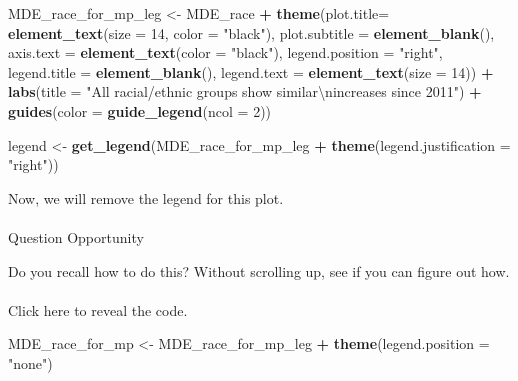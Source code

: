\documentclass[
]{article}
\newenvironment{Shaded}{\begin{snugshade}}{\end{snugshade}}
\newcommand{\CharTok}[1]{\textcolor[rgb]{0.31,0.60,0.02}{#1}}
\newcommand{\DataTypeTok}[1]{\textcolor[rgb]{0.13,0.29,0.53}{#1}}
\newcommand{\DecValTok}[1]{\textcolor[rgb]{0.00,0.00,0.81}{#1}}
\newcommand{\KeywordTok}[1]{\textcolor[rgb]{0.13,0.29,0.53}{\textbf{#1}}}
\newcommand{\NormalTok}[1]{#1}
\newcommand{\OperatorTok}[1]{\textcolor[rgb]{0.81,0.36,0.00}{\textbf{#1}}}
\newcommand{\StringTok}[1]{\textcolor[rgb]{0.31,0.60,0.02}{#1}}
\begin{document}
\begin{Shaded}
\begin{Highlighting}[]
\NormalTok{MDE_race_for_mp_leg <-}\StringTok{ }\NormalTok{MDE_race }\OperatorTok{+}
\StringTok{  }\KeywordTok{theme}\NormalTok{(}\DataTypeTok{plot.title=} \KeywordTok{element_text}\NormalTok{(}\DataTypeTok{size =} \DecValTok{14}\NormalTok{, }\DataTypeTok{color =} \StringTok{"black"}\NormalTok{),}
        \DataTypeTok{plot.subtitle =} \KeywordTok{element_blank}\NormalTok{(),}
        \DataTypeTok{axis.text =} \KeywordTok{element_text}\NormalTok{(}\DataTypeTok{color =} \StringTok{"black"}\NormalTok{),}
        \DataTypeTok{legend.position =} \StringTok{"right"}\NormalTok{, }
        \DataTypeTok{legend.title =} \KeywordTok{element_blank}\NormalTok{(),}
        \DataTypeTok{legend.text =} \KeywordTok{element_text}\NormalTok{(}\DataTypeTok{size =} \DecValTok{14}\NormalTok{)) }\OperatorTok{+}
\StringTok{  }\KeywordTok{labs}\NormalTok{(}\DataTypeTok{title =} \StringTok{"All racial/ethnic groups show similar}\CharTok{\textbackslash{}n}\StringTok{increases since 2011"}\NormalTok{) }\OperatorTok{+}
\StringTok{  }\KeywordTok{guides}\NormalTok{(}\DataTypeTok{color =} \KeywordTok{guide_legend}\NormalTok{(}\DataTypeTok{ncol =} \DecValTok{2}\NormalTok{))}

\NormalTok{legend <-}\StringTok{ }\KeywordTok{get_legend}\NormalTok{(MDE_race_for_mp_leg }\OperatorTok{+}
\StringTok{          }\KeywordTok{theme}\NormalTok{(}\DataTypeTok{legend.justification =} \StringTok{"right"}\NormalTok{))}
\end{Highlighting}
\end{Shaded}

Now, we will remove the legend for this plot.

\hypertarget{section-50}{%
\paragraph{}\label{section-50}}

Question Opportunity

Do you recall how to do this? Without scrolling up, see if you can
figure out how.

\hypertarget{section-51}{%
\paragraph{}\label{section-51}}

Click here to reveal the code.

\begin{Shaded}
\begin{Highlighting}[]
\NormalTok{MDE_race_for_mp <-}\StringTok{ }\NormalTok{MDE_race_for_mp_leg }\OperatorTok{+}
\StringTok{  }\KeywordTok{theme}\NormalTok{(}\DataTypeTok{legend.position =} \StringTok{"none"}\NormalTok{)}
\end{Highlighting}
\end{Shaded}
\end{document}
